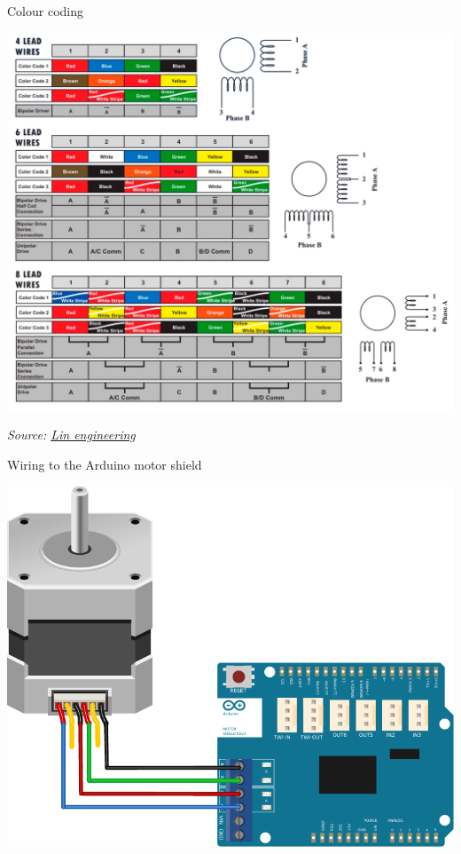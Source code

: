 \documentclass[compress]{beamer}
\newcommand{\source}[2]{{\tiny\it Source: \href{#1}{#2}}}
\begin{document}
\begin{frame}{Colour coding}

    \begin{center}
        \includegraphics[width=0.75\linewidth]{color-codes}

        \source{https://www.linengineering.com/}{Lin engineering}
    \end{center}
\end{frame}


\begin{frame}{Wiring to the Arduino motor shield}

    \begin{center}
        \includegraphics[width=0.8\linewidth]{unipolar-wiring}
    \end{center}
\end{frame}
\end{document}
